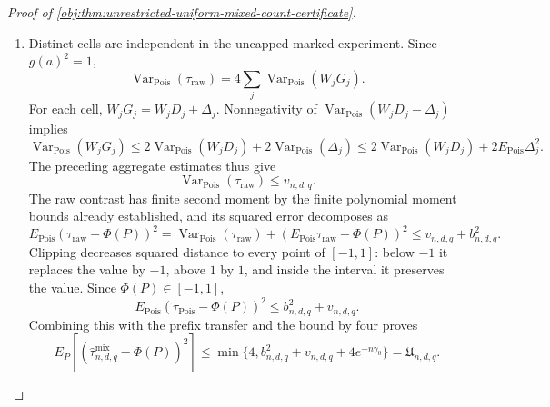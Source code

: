 \begin{proof}[Proof of \cref{obj:thm:unrestricted-uniform-mixed-count-certificate}]
\begin{enumerate}
\item Distinct cells are independent in the uncapped marked experiment.
Since \(g(a)^2=1\),
\[
\operatorname{Var}_{\mathrm{Pois}}(\tau_{\mathrm{raw}})
=4\sum_j\operatorname{Var}_{\mathrm{Pois}}(W_jG_j).
\]
For each cell, \(W_jG_j=W_jD_j+\Delta_j\). Nonnegativity of
\(\operatorname{Var}_{\mathrm{Pois}}(W_jD_j-\Delta_j)\) implies
\[
\operatorname{Var}_{\mathrm{Pois}}(W_jG_j)
\le
2\operatorname{Var}_{\mathrm{Pois}}(W_jD_j)
+2\operatorname{Var}_{\mathrm{Pois}}(\Delta_j)
\le
2\operatorname{Var}_{\mathrm{Pois}}(W_jD_j)
+2E_{\mathrm{Pois}}\Delta_j^2.
\]
The preceding aggregate estimates thus give
\[
\operatorname{Var}_{\mathrm{Pois}}(\tau_{\mathrm{raw}})
\le v_{n,d,q}.
\]
The raw contrast has finite second moment by the finite polynomial moment
bounds already established, and its squared error decomposes as
\[
E_{\mathrm{Pois}}(\tau_{\mathrm{raw}}-\Phi(P))^2
=
\operatorname{Var}_{\mathrm{Pois}}(\tau_{\mathrm{raw}})
+(E_{\mathrm{Pois}}\tau_{\mathrm{raw}}-\Phi(P))^2
\le v_{n,d,q}+b_{n,d,q}^2.
\]
Clipping decreases squared distance to every point of \([-1,1]\): below
\(-1\) it replaces the value by \(-1\), above \(1\) by \(1\), and inside the
interval it preserves the value. Since \(\Phi(P)\in[-1,1]\),
\[
E_{\mathrm{Pois}}(\widetilde\tau_{\mathrm{Pois}}-\Phi(P))^2
\le b_{n,d,q}^2+v_{n,d,q}.
\]
Combining this with the prefix transfer and the bound by four proves
\[
E_P\!\left[
(\widehat\tau^{\mathrm{mix}}_{n,d,q}-\Phi(P))^2
\right]
\le
\min\{4,b_{n,d,q}^2+v_{n,d,q}+4e^{-n\gamma_0}\}
=\mathfrak U_{n,d,q}.
\]


\end{enumerate}
\end{proof}
